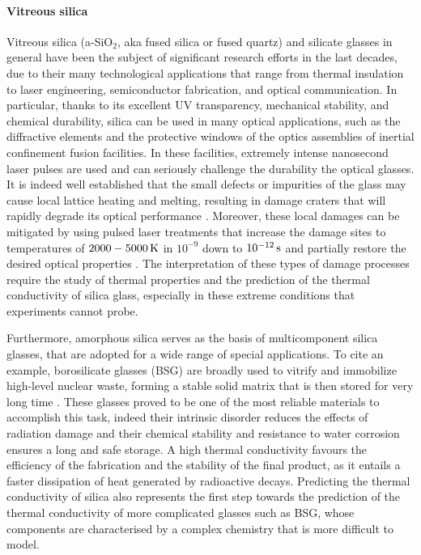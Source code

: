 \paragraph{Vitreous silica}
Vitreous silica (a-SiO$_2$, aka fused silica or fused quartz) and silicate glasses in general have been the subject of significant research efforts in the last decades, due to their many technological applications that range from thermal insulation to laser engineering, semiconductor fabrication, and optical communication.
In particular, thanks to its excellent UV transparency, mechanical stability, and chemical durability, silica can be used in many optical applications, such as the diffractive elements and the protective windows of the optics assemblies of inertial confinement fusion facilities. In these facilities, extremely intense nanosecond laser pulses are used and can seriously challenge the durability the optical glasses. It is indeed well established that the small defects or impurities of the glass may cause local lattice heating and melting, resulting in damage craters that will rapidly degrade its optical performance \cite{Miller2004,Canaud2004,Miller2010,Chambonneau2014,Kuzuu1999,Stuart1995,Wong2006,Carr2010,Saito2000}. Moreover, these local damages can be mitigated by using pulsed laser treatments that increase the damage sites to temperatures of $2000-5000\,\mathrm{K}$ in $10^{-9}$ down to $10^{-12}\,\mathrm{s}$ and partially restore the desired optical properties \cite{Soules2011}. 
The interpretation of these types of damage processes require the study of thermal properties and the prediction of the thermal conductivity of silica glass, especially in these extreme conditions that experiments cannot probe.

Furthermore, amorphous silica serves as the basis of multicomponent silica glasses, that are adopted for a wide range of special applications. 
To cite an example, borosilicate glasses (BSG) are broadly used to vitrify and immobilize high-level nuclear waste, forming a stable solid matrix that is then stored for very long time \cite{OjovanBook13}. These glasses proved to be one of the most reliable materials to accomplish this task, indeed their intrinsic disorder reduces the effects of radiation damage and their chemical stability and resistance to water corrosion ensures a long and safe storage. A high thermal conductivity favours the efficiency of the fabrication and the stability of the final product, as it entails a faster dissipation of heat generated by radioactive decays. 
Predicting the thermal conductivity of silica also represents the first step towards the prediction of the thermal conductivity of more complicated glasses such as BSG, whose components are characterised by a complex chemistry that is more difficult to model. 

